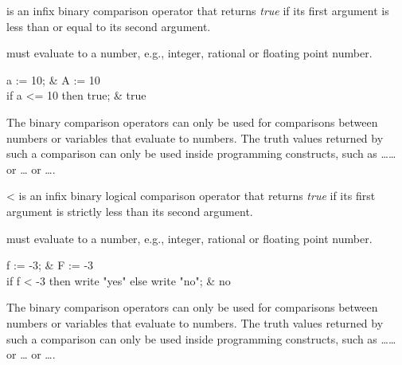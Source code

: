 \begin{Operator}[leqsign]{\leq}
\name{<=} is an infix binary comparison operator that returns
{\em true} if its first argument is less than or equal to its second argument.

\begin{Syntax}
 \name{<=} 
\end{Syntax}

 must evaluate to a number, e.g., integer, rational or
floating point number.

\begin{Examples}
a := 10;                     &     A := 10 \\
if a <= 10 then true;        &     true
\end{Examples}

\begin{Comments}

The binary comparison operators can only be used for comparisons between
numbers or variables that evaluate to numbers.  The truth values returned
by such a comparison can only be used inside programming constructs, such
as \ldots{}\ldots{} or
\ldots{} or \ldots{}.
\end{Comments}
\end{Operator}


\begin{Operator}[less]{\textless}
\name{<} is an infix binary logical comparison operator that
returns {\em true} if its first argument is strictly less than its second
argument.

\begin{Syntax}
 \name{<} 
\end{Syntax}

 must evaluate to a number, e.g., integer, rational or
floating point number.

\begin{Examples}
f := -3;                                               &       F := -3 \\
if f < -3 then write "yes" else write "no";            &       no
\end{Examples}

\begin{Comments}
The binary comparison operators can only be used for comparisons between
numbers or variables that evaluate to numbers.  The truth values returned
by such a comparison can only be used inside programming constructs, such
as \ldots{}\ldots{}
or \ldots{} or
\ldots{}.
\end{Comments}
\end{Operator}


